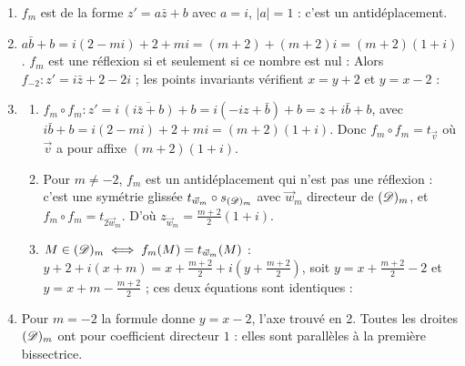 \begin{corrige}
\begin{sol}
\begin{enumerate}
\end{enumerate}
\end{sol}
\begin{sol}
\begin{enumerate}
      \item $f_m$ est de la forme $z' = a\bar{z} + b$ avec $a = i$, $|a| = 1$ : c'est un antidéplacement.
      \item $a\bar{b} + b = i(2 - mi) + 2 + mi = (m + 2) + (m+2)i = (m+2)(1+i)$.
            $f_m$ est une réflexion si et seulement si ce nombre est nul : 
            Alors $f_{-2} : z' = i\bar{z} + 2 - 2i$ ; les points invariants vérifient $x = y + 2$ et $y = x - 2$ :
      \item \begin{enumerate}
                  \item $f_m \circ f_m : z' = i\,\overline{(i\bar{z} + b)} + b = i(-iz + \bar{b}) + b = z + i\bar{b} + b$, avec
                        $i\bar{b} + b = i(2 - mi) + 2 + mi = (m+2)(1+i)$. Donc $f_m \circ f_m = t_{\vec{v}}$ où $\vec{v}$ a pour affixe $(m+2)(1+i)$.
                  \item Pour $m \neq -2$, $f_m$ est un antidéplacement qui n'est pas une réflexion : c'est une symétrie glissée $t_{\vec{w}_m} \circ s_{(\mathscr{D})_m}$
                        avec $\vec{w}_m$ directeur de $(\mathscr{D})_m$, et $f_m \circ f_m = t_{2\vec{w}_m}$. D'où $z_{\vec{w}_m} = \frac{m+2}{2}(1+i)$.
                  \item $M \in (\mathscr{D})_m \iff f_m(M) = t_{\vec{w}_m}(M)$ :
                        $y + 2 + i(x + m) = x + \frac{m+2}{2} + i\left(y + \frac{m+2}{2}\right)$, soit
                        $y = x + \frac{m+2}{2} - 2$ et $y = x + m - \frac{m+2}{2}$ ; ces deux équations sont identiques :
            \end{enumerate}
      \item Pour $m = -2$ la formule donne $y = x - 2$, l'axe trouvé en 2. Toutes les droites $(\mathscr{D})_m$ ont pour coefficient directeur $1$ :
            elles sont parallèles à la première bissectrice.
\end{enumerate}
\end{sol}
\begin{sol}

\end{sol}
\end{corrige}
